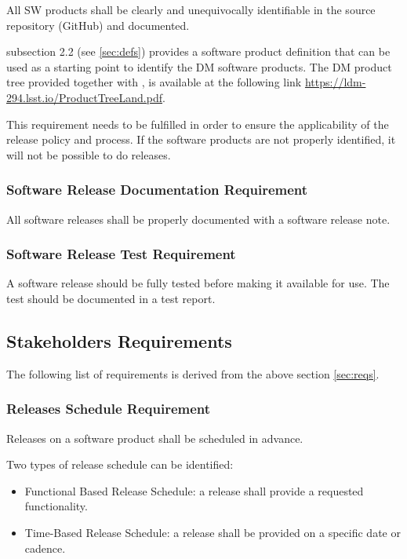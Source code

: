 All \gls{SW} products shall be clearly and unequivocally identifiable in the source repository (GitHub) and documented.

 subsection 2.2 (see \ref{sec:defs}) provides a software product definition that can be used as a starting point to identify the DM software products.
The DM product tree provided together with , is available at the following link \url{https://ldm-294.lsst.io/ProductTreeLand.pdf}.

This requirement needs to be fulfilled in order to ensure the applicability of the release policy and process.
If the software products are not properly identified, it will not be possible to do releases.


\subsubsection{Software Release Documentation Requirement} \label{sec:reqdoc}

All software releases shall be properly documented with a software release note.


\subsubsection{Software Release Test Requirement} \label{sec:test}

A software release should be fully tested before making it available for use.
The test should be documented in a test report.


\subsection{Stakeholders Requirements} \label{sec:stakeholdersreqs}

The following list of requirements is derived from the above section \ref{sec:reqs}.


\subsubsection{Releases Schedule Requirement} \label{sec:milestone}

Releases on a software product shall be scheduled in advance.

Two types of release schedule can be identified:

\begin{itemize}
\item Functional Based Release Schedule: a release shall provide a requested functionality.
\item Time-Based Release Schedule: a release shall be provided on a specific date or cadence.
\end{itemize}

